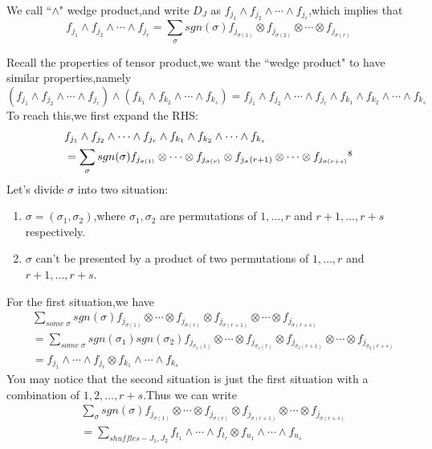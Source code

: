 \documentclass{article}
\begin{document}
\begin{dde}
	We call ``$\wedge$" wedge product,and write $D_J$ as $f_{j_1}\wedge f_{j_2}\wedge\cdots\wedge f_{j_r}$,which implies that
	\[f_{j_1}\wedge f_{j_2}\wedge\cdots\wedge f_{j_r}=\sum\limits_{\sigma}sgn(\sigma)f_{j_{\sigma(1)}}\otimes f_{j_{\sigma(2)}}\otimes\cdots\otimes f_{j_{\sigma(r)}}\] 
\end{dde}
Recall the properties of tensor product,we want the ``wedge product" to have similar properties,namely
\[(f_{j_1}\wedge f_{j_2}\wedge\cdots\wedge f_{j_r})\wedge(f_{k_1}\wedge f_{k_2}\wedge\cdots\wedge f_{k_s})=f_{j_1}\wedge f_{j_2}\wedge\cdots\wedge f_{j_r}\wedge f_{k_1}\wedge f_{k_2}\wedge\cdots\wedge f_{k_s}\]
To reach this,we first expand the RHS:
\begin{align*}
	&f_{j_1}\wedge f_{j_2}\wedge\cdots\wedge f_{j_r}\wedge f_{k_1}\wedge f_{k_2}\wedge\cdots\wedge f_{k_s}\\
	&=\sum\limits_{\sigma}sgn(\sigma)f_{j_{\sigma(1)}}\otimes\cdots\otimes f_{j_{\sigma(r)}}\otimes f_{j_\sigma(r+1)}\otimes\cdots\otimes f_{j_{\sigma(r+s)}}\footnotemark[8]
\end{align*}
Let's divide $\sigma$ into two situation:
\begin{enumerate}
	\item $\sigma=(\sigma_1,\sigma_2)$,where $\sigma_1,\sigma_2$ are permutations of $1,\dots,r$ and $r+1,\dots,r+s$ respectively.
	\item $\sigma$ can't be presented by a product of two permutations of $1,\dots,r$ and $r+1,\dots,r+s$.
\end{enumerate}
For the first situation,we have
\begin{align*}
	&\sum\limits_{some\;\sigma}sgn(\sigma)f_{j_{\sigma(1)}}\otimes\cdots\otimes f_{j_{\sigma(r)}}\otimes f_{j_{\sigma(r+1)}}\otimes\cdots\otimes f_{j_{\sigma(r+s)}}\\
	&=\sum\limits_{some\;\sigma}sgn(\sigma_1)sgn(\sigma_2)f_{j_{\sigma_1(1)}}\otimes\cdots\otimes f_{j_{\sigma_1(r)}}\otimes f_{j_{\sigma_2(r+1)}}\otimes\cdots\otimes f_{j_{\sigma_2(r+s)}}\\
	&=f_{j_1}\wedge\cdots\wedge f_{j_r}\otimes f_{k_1}\wedge\cdots\wedge f_{k_s}
\end{align*}
You may notice that the second situation is just the first situation with a combination of $1,2,\dots,r+s$.Thus we can write
\begin{align*}
	&\sum\limits_{\sigma}sgn(\sigma)f_{j_{\sigma(1)}}\otimes\cdots\otimes f_{j_{\sigma(r)}}\otimes f_{j_{\sigma(r+1)}}\otimes\cdots\otimes f_{j_{\sigma(r+s)}}\\
	&=\sum\limits_{shuffles-J_1,J_2}f_{t_1}\wedge\cdots\wedge f_{t_r}\otimes f_{u_1}\wedge\cdots\wedge f_{u_s}
\end{align*} 
\end{document}

